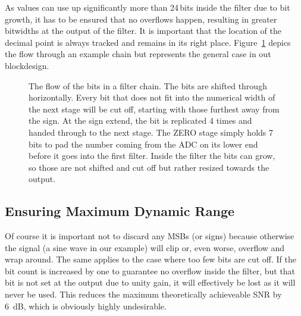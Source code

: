 As values can use up significantly  more than \num{24}\,bits inside the filter
due to bit growth, it has to be ensured that no overflows happen, resulting in
greater  bitwidths at  the output  of the  filter.  It  is important  that the
location  of the  decimal point  is always  tracked and  remains in  its right
place.  Figure~\ref{fig:fpga:bitflow} depics the flow through an example chain
but represents the general case in out blockdesign.

\begin{figure}
    \centering
    
    \caption[Bit Flow in Filter Chain]{%
        The flow of  the bits in a filter chain. The  bits are shifted through
        horizontally. Every bit that does not fit into the numerical width of
        the next stage will be cut off, starting with those furthest away from
        the sign. At the  sign extend, the bit is replicated  \num{4} times and
        handed through to the next  stage. The ZERO stage simply holds \num{7}
         bits to pad the number coming from the ADC on its lower end
        before it goes  into the first filter. Inside the filter  the bits can
        grow, so those are not shifted  and cut off but rather resized towards
        the output.%
    }
    \label{fig:fpga:bitflow}
\end{figure}

%
%
\subsection{Ensuring Maximum Dynamic Range} %
\label{subsec:fpga:maximize_dynamic_range}

Of course it is important not to discard any MSBs (or signs) because otherwise
the signal (a sine wave in our example) will clip or, even worse, overflow and
wrap around. The same applies  to the case where too few  bits are cut off. If
the bit count is increased by one  to guarantee no overflow inside the filter,
but that bit is  not set at the output due to unity  gain, it will effectively
be lost as it  will never be used.  This reduces the maximum theoretically achieveable SNR  by \SI{6}{\dB}, which is
obviously highly undesirable.

